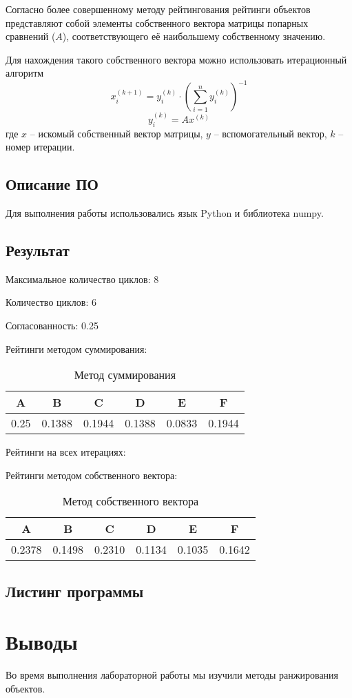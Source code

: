\documentclass[a4paper,14pt]{extarticle}
\begin{document}
Согласно более совершенному методу рейтингования рейтинги объектов
представляют собой элементы собственного вектора матрицы попарных
сравнений ($A$), соответствующего её наибольшему собственному значению.

Для нахождения такого собственного вектора можно использовать
итерационный алгоритм
\begin{equation*}
    x_i^{(k+1)}=y_i^{(k)}\cdot\left( \sum_{i=1}^n y_i^{(k)} \right)^{-1}
\end{equation*}
\begin{equation*}
    y_i^{(k)} = Ax^{(k)}
\end{equation*}
где $x$ – искомый собственный вектор матрицы, $y$ – вспомогательный
вектор, $k$ – номер итерации.

\subsection{Описание ПО}
Для выполнения работы использовались язык Python и библиотека
numpy.

\subsection{Результат}
Максимальное количество циклов: 8

Количество циклов: 6

Согласованность: 0.25

Рейтинги методом суммирования:
\begin{table}[H]
    \centering
    \begin{tabular}{ |c|c|c|c|c|c| } 
     \hline
        A    & B & C & D & E& F \\ \hline
        0.25 & 0.1388 & 0.1944 & 0.1388 & 0.0833 & 0.1944\\ \hline
    \end{tabular}
    \caption{Метод суммирования}
\end{table}

Рейтинги на всех итерациях:

Рейтинги методом собственного вектора:
\begin{table}[H]
    \centering
    \begin{tabular}{ |c|c|c|c|c|c| } 
     \hline
        A    & B & C & D & E& F \\ \hline
        0.2378& 0.1498& 0.2310& 0.1134& 0.1035& 0.1642\\ \hline
    \end{tabular}
    \caption{Метод собственного вектора}
\end{table}

\subsection{Листинг программы}

\section*{Выводы}
Во время выполнения лабораторной работы мы 
изучили методы ранжирования объектов.
\end{document}
